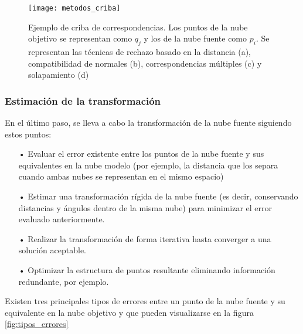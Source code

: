 \begin{figure}
\centering
\texttt{[image: metodos\_criba]}
\caption{Ejemplo de criba de correspondencias. Los puntos de la nube objetivo se representan como $q_j$ y los de la nube fuente como $p_i$. Se representan las técnicas de rechazo basado en la distancia (a), compatibilidad de normales (b), correspondencias múltiples (c) y solapamiento (d)}\label{fig:metodos_criba}
\end{figure}

\subsubsection{Estimación de la transformación}
En el último paso, se lleva a cabo la transformación de la nube fuente siguiendo estos puntos:

\begin{itemize}
\item[•]Evaluar el error existente entre los puntos de la nube fuente y sus equivalentes en la nube modelo (por ejemplo, la distancia que los separa cuando ambas nubes se representan en el mismo espacio)
\item[•]Estimar una transformación rígida de la nube fuente (es decir, conservando distancias y ángulos dentro de la misma nube) para minimizar el error evaluado anteriormente.
\item[•]Realizar la transformación de forma iterativa hasta converger a una solución aceptable.
\item[•]Optimizar la estructura de puntos resultante eliminando información redundante, por ejemplo.
\end{itemize}

Existen tres principales tipos de errores entre un punto de la nube fuente y su equivalente en la nube objetivo y que pueden visualizarse en la figura \ref{fig:tipos_errores} 

